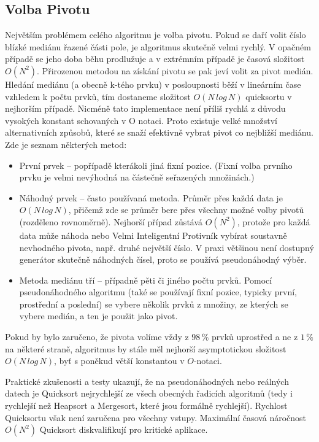 \documentclass{article}
\begin{document}
\subsection{Volba Pivotu}
Největším problémem celého algoritmu je volba pivotu. Pokud se daří volit číslo blízké mediánu řazené části pole, je algoritmus skutečně velmi rychlý. V opačném případě se jeho doba běhu prodlužuje a v extrémním případě je časová složitost $O(N^2)$. Přirozenou metodou na získání pivotu se pak jeví volit za pivot medián. Hledání mediánu (a obecně k-tého prvku) v posloupnosti běží v lineárním čase vzhledem k počtu prvků, tím dostaneme složitost $O(N\,log\,N)$ quicksortu v nejhorším případě. Nicméně tato implementace není příliš rychlá z důvodu vysokých konstant schovaných v O notaci. Proto existuje velké množství alternativních způsobů, které se snaží efektivně vybrat pivot co nejbližší mediánu. Zde je seznam některých metod:
\begin{itemize}
    \item{První prvek – popřípadě kterákoli jiná fixní pozice. (Fixní volba prvního prvku je velmi nevýhodná na částečně seřazených množinách.)}
    \item {Náhodný prvek – často používaná metoda. Průměr přes každá data je $O(N\,log\,N)$, přičemž zde se průměr bere přes všechny možné volby pivotů (rozděleno rovnoměrně). Nejhorší případ zůstává $O(N^2)$, protože pro každá data může náhoda nebo Velmi Inteligentní Protivník vybírat soustavně nevhodného pivota, např. druhé největší číslo. V praxi většinou není dostupný generátor skutečně náhodných čísel, proto se používá pseudonáhodný výběr.}
    \item{Metoda mediánu tří – případně pěti či jiného počtu prvků. Pomocí pseudonáhodného algoritmu (také se používají fixní pozice, typicky první, prostřední a poslední) se vybere několik prvků z množiny, ze kterých se vybere medián, a ten je použit jako pivot.}
\end{itemize}
Pokud by bylo zaručeno, že pivota volíme vždy z $98\,\%$ prvků uprostřed a ne z $1\,\%$ na některé straně, algoritmus by stále měl nejhorší asymptotickou složitost $O(N\,log\,N)$, byť s poněkud větší konstantou v $O$-notaci.

Praktické zkušenosti a testy ukazují, že na pseudonáhodných nebo reálných datech je Quicksort nejrychlejší ze všech obecných řadicích algoritmů (tedy i rychlejší než Heapsort a Mergesort, které jsou formálně rychlejší). Rychlost Quicksortu však není zaručena pro všechny vstupy. Maximální časová náročnost $O(N^2)$ Quicksort diskvalifikují pro kritické aplikace.
\end{document}
